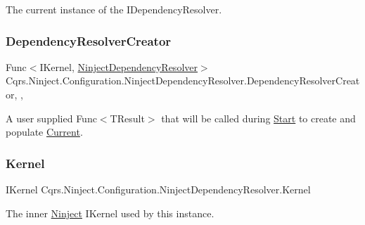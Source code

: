 The current instance of the I\+Dependency\+Resolver. 

\mbox{\label{classCqrs_1_1Ninject_1_1Configuration_1_1NinjectDependencyResolver_a11ea52beeb7420d21c99baeb3501aa0a}} 
\subsubsection{\texorpdfstring{Dependency\+Resolver\+Creator}{DependencyResolverCreator}}
{\footnotesize\ttfamily Func$<$I\+Kernel, \hyperlink{classCqrs_1_1Ninject_1_1Configuration_1_1NinjectDependencyResolver}{Ninject\+Dependency\+Resolver}$>$ Cqrs.\+Ninject.\+Configuration.\+Ninject\+Dependency\+Resolver.\+Dependency\+Resolver\+Creator\hspace{0.3cm}{\ttfamily [static]}, {\ttfamily [get]}, {\ttfamily [set]}}



A user supplied Func$<$\+T\+Result$>$ that will be called during \hyperlink{classCqrs_1_1Ninject_1_1Configuration_1_1NinjectDependencyResolver_adc6171ed45679dcbaa67782770ba5083}{Start} to create and populate \hyperlink{classCqrs_1_1Ninject_1_1Configuration_1_1NinjectDependencyResolver_a2a8ebdf55ecac9eccccc237d422a3f31}{Current}. 

\mbox{\label{classCqrs_1_1Ninject_1_1Configuration_1_1NinjectDependencyResolver_a507ba37916f7e77cd5bbcc14543c03b5}} 
\subsubsection{\texorpdfstring{Kernel}{Kernel}}
{\footnotesize\ttfamily I\+Kernel Cqrs.\+Ninject.\+Configuration.\+Ninject\+Dependency\+Resolver.\+Kernel\hspace{0.3cm}{\ttfamily [get]}}



The inner \hyperlink{namespaceCqrs_1_1Ninject}{Ninject} I\+Kernel used by this instance. 

